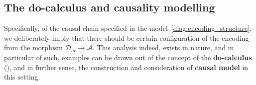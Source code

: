 \subsection{The do-calculus and causality modelling}
Specifically, of the causal chain specified in the model~\ref{diag:encoding_structure}, we deliberately imply that there should be certain configuration of the encoding from the morphism $\mathcal{D}_{m}\to \mathcal{A}$. This analysis indeed, exists in nature, and in particular of such, examples can be drawn out of the concept of the \textbf{do-calculus} (\cite{tucci2013introductionjudeapearlsdocalculus}), and in further sense, the construction and consideration of \textbf{causal model} in this setting. 


